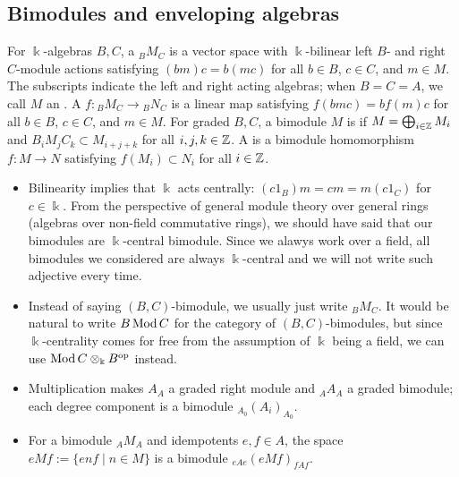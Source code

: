 \subsection{Bimodules and enveloping algebras}


\begin{definition}\label{def:bimodule}
For $\Bbbk$-algebras $B,C$, a  $ {}_BM_C$ is a vector space with $\Bbbk$-bilinear left $B$- and right $C$-module actions satisfying $(bm)c=b(mc)$ for all $b\in B$, $c\in C$, and $m\in M$.
The subscripts indicate the left and right acting algebras; when $B=C=A$, we call $M$ an .
A  $f:{}_BM_C\to{}_BN_C$ is a linear map satisfying $f(bmc)=bf(m)c$ for all $b\in B$, $c\in C$, and $m\in M$.
For graded $B,C$, a bimodule $M$ is  if $M=\bigoplus_{i\in\mathbb{Z}}M_i$ and $B_iM_jC_k\subset M_{i+j+k}$ for all $i,j,k\in\mathbb{Z}$.
A  is a bimodule homomorphism $f:M\to N$ satisfying $f(M_i)\subset N_i$ for all $i\in\mathbb{Z}$.
\end{definition}

\label{not:bimodule-notation}
\begin{convention}
\begin{itemize}
\item Bilinearity implies that $\Bbbk$ acts centrally: $(c1_B)m=cm=m(c1_C)$ for $c\in\Bbbk$.  
From the perspective of general module theory over general rings (algebras over non-field commutative rings), we should have said that our bimodules are $\Bbbk$-central bimodule.  Since we alawys work over a field, all bimodules we considered are always $\Bbbk$-central and we will not write such adjective every time.

\item  Instead of saying $(B,C)$-bimodule, we usually just write ${}_BM_C$.
It would be natural to write $B\operatorname{\mathrm{Mod}} C$ for the category of $(B,C)$-bimodules, but since $\Bbbk$-centrality comes for free from the assumption of $\Bbbk$ being a field, we can use $\operatorname{\mathrm{Mod}} C\otimes_\Bbbk B^{\mathrm{op}}$ instead.
\end{itemize}
\end{convention}

\begin{example}
\begin{itemize}
\item Multiplication makes $A_A$ a graded right module and ${}_AA_A$ a graded bimodule; each degree component is a bimodule ${}_{A_0}(A_i)_{A_0}$.

\item For a bimodule ${}_AM_A$ and idempotents $e,f\in A$, the space $eMf:=\{enf\mid n\in M\}$ is a bimodule ${}_{eAe}(eMf)_{fAf}$.
\end{itemize}
\end{example}


